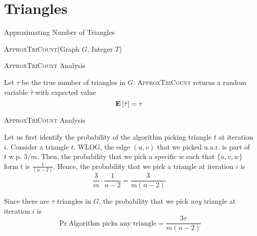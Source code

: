 \section{Triangles}

\begin{frame}[fragile]{Approximating Number of Triangles}
  \begin{algorithm}[H]
  \caption{\textsc{ApproxTriCount}(Graph \(G\), Integer \(T\))}
  \begin{algorithmic}
      \EndIf
    \EndFor
    \State{\Return \(\hat{\tau}\)}
  \end{algorithmic}
  \end{algorithm}
\end{frame}

\begin{frame}{\textsc{ApproxTriCount} Analysis}
  \begin{theorem}
    Let \(\tau\) be the true number of triangles in \(G\).
    \textsc{ApproxTriCount} returns a random variable \(\hat{\tau}\) with expected
    value
    \[ \mathbf{E}\left[\hat \tau\right] = \tau \]
  \end{theorem}
\end{frame}

\begin{frame}{\textsc{ApproxTriCount} Analysis}
  \begin{proofs}
    Let us first identify the probability of the algorithm picking triangle \(t\) at
    iteration \(i\). Consider a triangle \(t\). WLOG, the edge \((u, v)\) that we
    picked u.a.r. is part of \(t\) w.p. \(3/m\). Then, the probability that we
    pick a specific \(w\) such that \(\{u, v, w\}\) form \(t\) is \(\frac{1}{(n-2)}\).
    Hence, the probability that we pick a triangle at iteration \(i\) is
    \[ \frac{3}{m} \cdot \frac{1}{n-2} = \frac{3}{m(n-2)} \]

    Since there are \(\tau\) triangles in \(G\), the probability that we pick
    \textit{any} triangle at iteration \(i\) is
    \[ \Pr{\text{Algorithm picks any triangle}} = \frac{3\tau}{m(n-2)} \]
  \end{proofs}
\end{frame}

